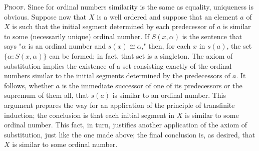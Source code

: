 \textsc{Proof}. Since for ordinal numbers similarity is the same as equality, uniqueness is obvious. Suppose now that $X$ is a well ordered and suppose that an element $a$ of $X$ is such that the initial segment determined by each predecessor of $a$ is similar to some (necessarily unique) ordinal number. If $S(x, \alpha)$ is the sentence that says "$\alpha$ is an ordinal number and $s(x) \cong \alpha$," then, for each $x$ in $s(a)$, the set $\{ \alpha : S(x, \alpha ) \}$ can be formed; in fact, that set is a singleton. The axiom of substitution implies the existence of a set consisting exactly of the ordinal numbers similar to the initial segments determined by the predecessors of $a$. It follows, whether $a$ is the immediate successor of one of its predecessors or the supremum of them all, that $s(a)$ is similar to an ordinal number. This argument prepares the way for an application of the principle of transfinite induction; the conclusion is that each initial segment in $X$ is similar to some ordinal number. This fact, in turn, justifies another application of the axiom of substitution, just like the one made above; the final conclusion is, as desired, that $X$ is similar to some ordinal number.